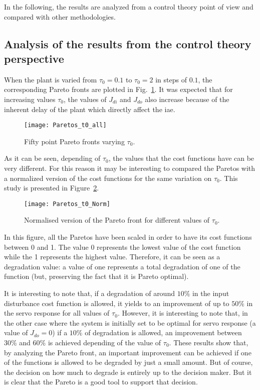 In the following, the results are analyzed from a control theory point of view and compared with other methodologies.
\subsection{Analysis of the results from the control theory perspective}
\label{sec:Control}
%
When the plant is varied from $\tau_0=0.1$ to $\tau_0=2$ in steps of $0.1$, the corresponding Pareto fronts are plotted in Fig.~\ref{fig:Paretos_t0_all}. It was expected that for increasing values $\tau_0$, the values of $J_{di}$ and $J_{do}$ also increase because of the inherent delay of the plant which directly affect the \gls{iae}.
%
\begin{figure}[tb]%
\centering
\texttt{[image: Paretos\_t0\_all]}%
\caption{Fifty point Pareto fronts varying $\tau_0$.}%
\label{fig:Paretos_t0_all}%
\end{figure}
%

As it can be seen, depending of $\tau_0$, the values that the cost functions have can be very different. For this reason it may be interesting to compared the Paretos with a normalized version of the cost functions for the same variation on $\tau_0$. This study is presented in Figure~\ref{fig:Paretos_t0_Norm}. %
%
\begin{figure}[tb]%
	\centering
	\texttt{[image: Paretos\_t0\_Norm]}%
	\caption{Normalised version of the Pareto front for different values of $\tau_0$.}%
	\label{fig:Paretos_t0_Norm}%
\end{figure}
%
In this figure, all the Paretos have been scaled in order to have its cost functions between 0 and 1. The value 0 represents the lowest value of the cost function while the 1 represents the highest value. Therefore, it can be seen as a degradation value: a value of one represents a total degradation of one of the function (but, preserving the fact that it is Pareto optimal).

It is interesting to note that, if a degradation of around $10\%$ in the input disturbance cost function is allowed, it yields to an improvement of up to $50\%$ in the servo response for all values of $\tau_0$. However, it is interesting to note that, in the other case where the system is initially set to be optimal for servo response (a value of $J_{do} = 0$) if a $10\%$ of degradation is allowed, an improvement between 30\% and 60\% is achieved depending of the value of $\tau_0$. These results show that, by analyzing the Pareto front, an important improvement can be achieved if one of the functions is allowed to be degraded  by just a small amount. But of course, the decision on how much to degrade is entirely up to the decision maker. But it is clear that the Pareto is a good tool to support that decision.

